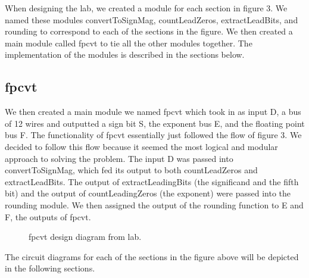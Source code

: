 \documentclass{article}
\begin{document}

When designing the lab, we created a module for each section in figure 3. We named these modules convertToSignMag, countLeadZeros, extractLeadBits, and rounding to correspond to each of the sections in the figure. We then created a main module called fpcvt to tie all the other modules together. The implementation of the modules is described in the sections below.

\subsection*{fpcvt}
We then created a main module we named fpcvt which took in as input D, a bus of 12 wires and outputted a sign bit S, the exponent bus E, and the floating point bus F. The functionality of fpcvt essentially just followed the flow of figure 3. We decided to follow this flow because it seemed the most logical and modular approach to solving the problem. The input D was passed into convertToSignMag, which fed its output to both countLeadZeros and extractLeadBits. The output of extractLeadingBits (the significand and the fifth bit) and the output of countLeadingZeros (the exponent) were passed into the rounding module. We then assigned the output of the rounding function to E and F, the outputs of fpcvt.

\begin{figure}[H]
	\begin{center}
		\caption{fpcvt design diagram from lab.}
	\end{center}
\end{figure}

The circuit diagrams for each of the sections in the figure above will be depicted in the following sections.
\end{document}
